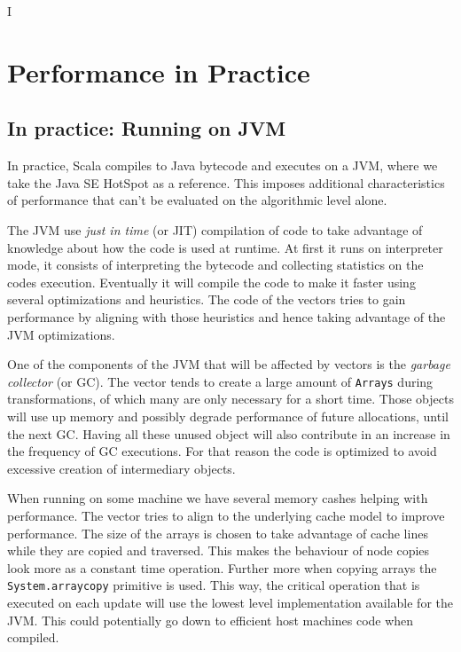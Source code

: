 I%

\chapter{ Performance in Practice} %

\label{Performance} %



\section{In practice: Running on JVM}
\label{InPractice}

In practice, Scala compiles to Java bytecode and executes on a JVM, where we take the Java SE HotSpot as a reference. This imposes additional characteristics of performance that can't be evaluated on the algorithmic level alone.

The JVM use \emph{just in time} (or JIT) compilation of code to take advantage of knowledge about how the code is used at runtime. At first it runs on interpreter mode, it consists of interpreting the bytecode and collecting statistics on the codes execution. Eventually it will compile the code to make it faster using several optimizations and heuristics. The code of the vectors tries to gain performance by aligning with those heuristics and hence taking advantage of the JVM optimizations.

One of the components of the JVM that will be affected by vectors is the \emph{garbage collector} (or GC). The vector tends to create a large amount of \texttt{Arrays} during transformations, of which many are only necessary for a short time. Those objects will use up memory and possibly degrade performance of future allocations, until the next GC. Having all these unused object will also contribute in an increase in the frequency of GC executions. For that reason the code is optimized to avoid excessive creation of intermediary objects.

When running on some machine we have several memory cashes helping with performance. The vector tries to align to the underlying cache model to improve performance. The size of the arrays is chosen to take advantage of cache lines while they are copied and traversed. This makes the behaviour of node copies look more as a constant time operation. Further more when copying arrays the \texttt{System.arraycopy} primitive is used. This way, the critical operation that is executed on each update will use the lowest level implementation available for the JVM. This could potentially go down to efficient host machines code when compiled.


